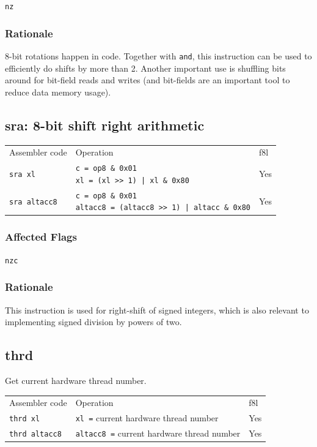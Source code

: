 \documentclass{book}
\begin{document}
\texttt{nz}

\subsubsection*{Rationale}

8-bit rotations happen in code. Together with \texttt{and}, this instruction can be used to efficiently do shifts by more than 2. Another important use is shuffling bits around for bit-field reads and writes (and bit-fields are an important tool to reduce data memory usage).


\subsection{sra: 8-bit shift right arithmetic}

\begin{tabular}{l l l}
Assembler code       & Operation                                                                               & f8l \\
\texttt{sra xl}      & \makecell{\texttt{c = op8 \& 0x01}\\\texttt{xl = (xl >> 1) | xl \& 0x80}}               & Yes \\
\texttt{sra altacc8} & \makecell{\texttt{c = op8 \& 0x01}\\\texttt{altacc8 = (altacc8 >> 1) | altacc \& 0x80}} & Yes
\end{tabular}

\subsubsection*{Affected Flags}

\texttt{nzc}

\subsubsection*{Rationale}

This instruction is used for right-shift of signed integers, which is also relevant to implementing signed division by powers of two.

\subsection{thrd}

Get current hardware thread number.

\begin{tabular}{l l l}
Assembler code        & Operation                                         & f8l \\
\texttt{thrd xl}      & \texttt{xl =} current hardware thread number      & Yes \\
\texttt{thrd altacc8} & \texttt{altacc8 =} current hardware thread number & Yes \\
\end{tabular}
\end{document}
